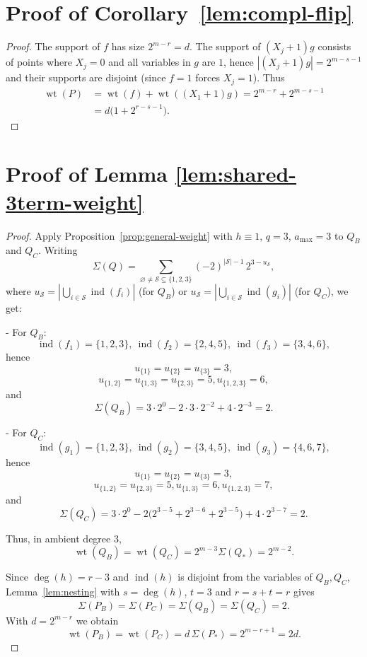 \documentclass[conference]{IEEEtran}
\theoremstyle{definition}
\newcommand{\wt}{\operatorname{wt}}
\newcommand{\ind}{\operatorname{ind}}
\begin{document}
\section{Proof of Corollary~\ref{lem:compl-flip}}

\begin{proof}
The support of $f$ has size $2^{m-r}=d$. The support of $(X_j+1)g$ consists of points where $X_j=0$ and all variables in $g$ are $1$, hence $| (X_j+1)g|=2^{m-s-1}$ and their supports are disjoint (since $f=1$ forces $X_j=1$). Thus
\[
\begin{aligned}
\wt(P)&=\wt(f)+\wt((X_1+1)g)=2^{m-r}+2^{m-s-1}
\\&= d\Big(1+2^{r-s-1}\Big).
\end{aligned}
\]
\end{proof}



\section{Proof of Lemma \ref{lem:shared-3term-weight}}

\begin{proof}
Apply Proposition~\ref{prop:general-weight} with $h\equiv1$, $q=3$,
$a_{\max}=3$ to $Q_B$ and $Q_C$.  Writing
\[
\Sigma(Q)
=\sum_{\varnothing\neq\mathcal S\subseteq\{1,2,3\}}
(-2)^{|\mathcal S|-1}\,2^{3-u_{\mathcal S}},
\]
where $u_{\mathcal S}=|\bigcup_{i\in\mathcal S}\ind(f_i)|$ (for $Q_B$)
or $u_{\mathcal S}=|\bigcup_{i\in\mathcal S}\ind(g_i)|$ (for $Q_C$),
we get:

- For $Q_B$:
  \[
  \ind(f_1)=\{1,2,3\},\ \ind(f_2)=\{2,4,5\},\ \ind(f_3)=\{3,4,6\},
  \]
  hence
  \[
  u_{\{1\}}=u_{\{2\}}=u_{\{3\}}=3,
  \]\[
  u_{\{1,2\}}=u_{\{1,3\}}=u_{\{2,3\}}=5,
  u_{\{1,2,3\}}=6,
  \]
  and
  \[
  \Sigma(Q_B)
  =3\cdot2^0-2\cdot3\cdot2^{-2}+4\cdot2^{-3}=2.
  \]

- For $Q_C$:
  \[
  \ind(g_1)=\{1,2,3\},\ \ind(g_2)=\{3,4,5\},\ \ind(g_3)=\{4,6,7\},
  \]
  hence
  \[
  u_{\{1\}}=u_{\{2\}}=u_{\{3\}}=3,
  \]\[
  u_{\{1,2\}}=u_{\{2,3\}}=5, 
  u_{\{1,3\}}=6, 
  u_{\{1,2,3\}}=7,
  \]
  and
  \[
  \Sigma(Q_C)
  =3\cdot2^0
   -2\bigl(2^{3-5}+2^{3-6}+2^{3-5}\bigr)
   +4\cdot2^{3-7}
  =2.
  \]

Thus, in ambient degree $3$,
\[
\wt(Q_B)=\wt(Q_C)=2^{m-3}\Sigma(Q_*)=2^{m-2}.
\]

Since $\deg(h)=r-3$ and $\ind(h)$ is disjoint from the variables of
$Q_B,Q_C$, Lemma~\ref{lem:nesting} with $s=\deg(h)$, $t=3$ and
$r=s+t=r$ gives
\[
\Sigma(P_B)=\Sigma(P_C)=\Sigma(Q_B)=\Sigma(Q_C)=2.
\]
With $d=2^{m-r}$ we obtain
\[
\wt(P_B)=\wt(P_C)=d\,\Sigma(P_*)=2^{m-r+1}=2d.
\]
\end{proof}
\end{document}
